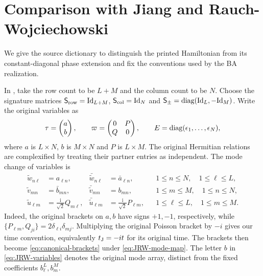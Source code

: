 \section{Comparison with Jiang and Rauch-Wojciechowski}
\label{sec:JRW-dictionary}

We give the source dictionary to distinguish the printed Hamiltonian
from its constant-diagonal phase extension and fix the conventions
used by the BA realization.

In \cite[equations (2.7)--(2.12)]{JRW1991}, take the row count to
be $L+M$ and the column count to be $N$. Choose the signature matrices
$\mathsf S_{\rm row}=\mathrm{Id}_{L+M}$, $\mathsf S_{\rm col}=\mathrm{Id}_N$ and
$\mathsf S_{\pm}=\operatorname{diag}(\mathrm{Id}_L,-\mathrm{Id}_M)$. Write the original variables as
\begin{equation}\label{eq:JRW-variables}
 \tau=\begin{pmatrix}a\\b\end{pmatrix},\qquad
 \varpi=\begin{pmatrix}0&P\\Q&0\end{pmatrix},\qquad
 E=\operatorname{diag}(\epsilon_1,\ldots,\epsilon_N),
\end{equation}
where $a$ is $L\times N$, $b$ is $M\times N$ and $P$ is
$L\times M$. The original Hermitian relations are complexified by
treating their partner entries as independent. The mode change of variables is
\begin{equation}\label{eq:JRW-mode-map}
\begin{aligned}
 \tilde w_{n\ell}&=a_{\ell n},&
 \bar{\tilde w}_{n\ell}&=\bar{a}_{\ell n},&&1\leq n\leq N,\quad1\leq\ell\leq L,\\
 \tilde v_{mn}&=\bar{b}_{mn},&
 \bar{\tilde v}_{mn}&=b_{mn},&&1\leq m\leq M,\quad1\leq n\leq N,\\
 \tilde u_{\ell m}&=\frac{\mathrm i}{\sqrt2}Q_{m\ell},&
 \bar{\tilde u}_{\ell m}&=\frac{\mathrm i}{\sqrt2}P_{\ell m},
 &&1\leq\ell\leq L,\quad1\leq m\leq M.
\end{aligned}
\end{equation}
Indeed, the original brackets on $a,b$ have signs $+1,-1$,
respectively, while $\{P_{\ell m},Q_{ji}\}=2\delta_{\ell i}\delta_{mj}$.
Multiplying the original Poisson bracket by $-i$ gives our time
convention, equivalently $t_{\rm J}=-it$ for its original time.
The brackets then become \cref{eq:canonical-brackets} under
\cref{eq:JRW-mode-map}. The letter $b$ in \cref{eq:JRW-variables}
denotes the original mode array, distinct from the fixed coefficients
$b_\ell^L,b_m^M$.


